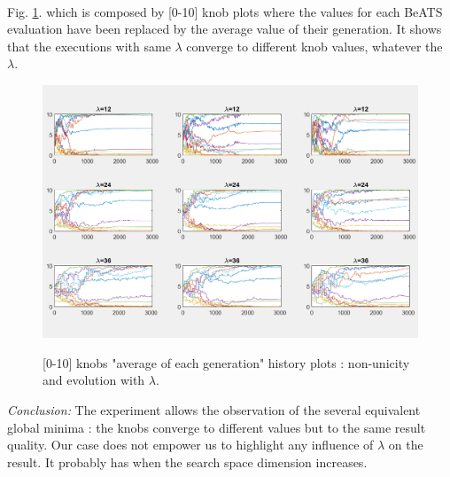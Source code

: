 \\
Fig. \ref{fig:lambdaknobsgenmean}. which is composed by [0-10] knob plots where the values for each BeATS evaluation have been replaced by the average value of their generation. It shows that the executions with same $\lambda$ converge to different knob values, whatever the $\lambda$. 
\begin{figure}[!h]
	\caption{[0-10] knobs "average of each generation" history plots : non-unicity and evolution with $\lambda$.}
	\includegraphics[width=7in]{figures/results_figures/lambda/knobs_lambda_all_genmean.png}
	\label{fig:lambdaknobsgenmean}
\end{figure}
\newpage
\emph{Conclusion:} The experiment allows the observation of the several equivalent global minima : the knobs converge to different values but to the same result quality. Our case does not empower us to highlight any influence of $\lambda$ on the result. It probably has when the search space dimension increases.
